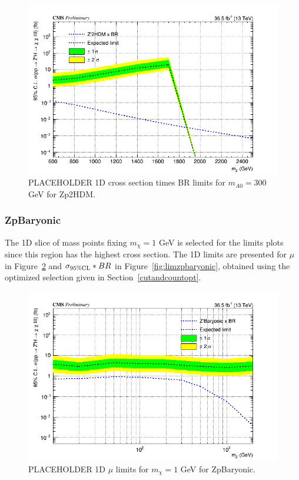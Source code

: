 \begin{figure}[tbh]
\centering
\includegraphics[width=5in]{figures/sigma_limits_4mu_Zp2HDM.png}
\caption{PLACEHOLDER 1D cross section times BR limits for $m_{A0} = 300$ GeV for Zp2HDM.}
\label{fig:limzp2hdm}
\end{figure}

\subsubsection{ZpBaryonic}

The 1D slice of mass points fixing $m_{\chi} = 1$ GeV is selected for the limits plots since this region has the highest cross section. The 1D limits are presented for $\mu$ in Figure~\ref{fig:limzpbaryonicmu} and $\sigma_{95\% \rm{CL}}*BR$ in Figure~\ref{fig:limzpbaryonic}, obtained using the optimized selection given in Section~\ref{cutandcountopt}.  

\begin{figure}[tbh]
\centering
\includegraphics[width=5in]{figures/sigma_limits_4mu_ZpBaryonic.png}
\caption{PLACEHOLDER 1D $\mu$ limits for $m_{\chi} = 1$ GeV for ZpBaryonic.}
\label{fig:limzpbaryonicmu}
\end{figure}


